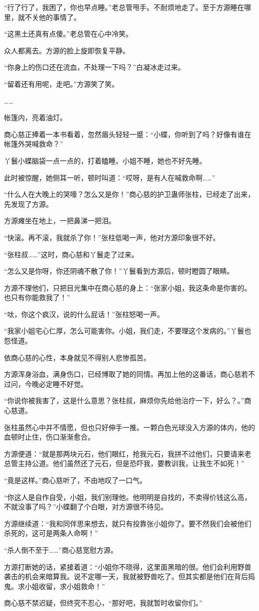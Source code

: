 \begin{this_body}
“行了行了，我困了，你也早点睡。”老总管甩手。不耐烦地走了。至于方源睡在哪里，就不关他的事情了。

“这黑土还真有点傻。”老总管在心中冷笑。

众人都离去。方源的脸上旋即恢复平静。

“你身上的伤口还在流血，不处理一下吗？”白凝冰走过来。

“留着还有用呢，走吧。”方源笑了笑。

……

帐篷内，亮着油灯。

商心慈正捧着一本书看着，忽然眉头轻轻一蹙：“小蝶，你听到了吗？好像有谁在帐篷外哭喊救命？”

丫鬟小蝶脑袋一点一点的，打着瞌睡。小姐不睡，她也不好先睡。

此时被惊醒，她侧耳一听，顿时叫道：“哎呀，是有人在喊救命啊……”

“什么人在大晚上的哭嚎？怎么又是你！”商心慈的护卫蛊师张柱，已经走了出来，先发现了方源。

方源瘫坐在地上，一把鼻涕一把泪。

“快滚。再不滚，我就杀了你！”张柱低喝一声，他对方源印象很不好。

“张柱叔……”这时，商心慈和丫鬟走了过来。

“怎么又是你呀，你还阴魂不散了你！”丫鬟看到方源后，顿时瞪圆了眼睛。

方源不理他们，只把目光集中在商心慈的身上：“张家小姐，我这条命是你害的。也只有你能救我了！”

“呔，你这个疯汉，说的什么屁话！”张柱怒喝一声。

“我家小姐宅心仁厚，怎么可能害你。小姐，我们走，不要理这个发病的。”丫鬟也怨怪道。

依商心慈的心性，本身就见不得别人悲惨孤苦。

方源浑身浴血，满身伤口，已经博取了她的同情。再加上他的这番话，商心慈若不过问，今晚必定睡不好觉。

“你说你被我害了，这是什么意思？张柱叔，麻烦你先给他治疗一下，好么？。”商心慈道。

张柱虽然心中并不情愿，但也只好伸手一推。一颗白色光球没入方源的体内，他的血顿时止住，伤口渐渐愈合。

方源便道：“就是那两块元石，他们眼红，抢我元石，我拼不过他们，只要请来老总管主持公道。他们虽然还了元石，但是恐吓我，要教训我，让我生不如死！”

“竟是这样。”商心慈听了，不由地叹了一口气。

“你这人是自作自受，小姐，我们别理他。他明明是自找的，不卖得价钱这么高，不就没事了吗？”小蝶翻了个白眼，对方源很不待见。

方源继续道：“我和同伴思来想去，就只有投靠张小姐你了。要不然我们会被他们杀死的，这可是两条人命啊！”

“杀人倒不至于……”商心慈宽慰方源。

方源打断她的话，紧接着道：“小姐你不晓得，这里面黑暗的很。他们会利用野兽袭击的机会来暗算我。说不定哪一天，我就被野兽吃了。但其实都是他们在背后捣鬼。求小姐收留，求小姐救命！”

商心慈不禁迟疑，但终究不忍心，“那好吧，我就暂时收留你们。”

\end{this_body}

